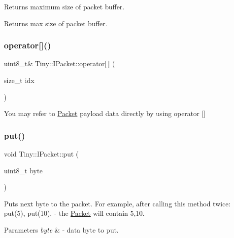 Returns maximum size of packet buffer. \begin{DoxyReturn}{Returns}
max size of packet buffer. 
\end{DoxyReturn}
\mbox{\label{classTiny_1_1IPacket_aa1d796806e21d1c72a1fc12d2f6db592}} 
\subsubsection{\texorpdfstring{operator[]()}{operator[]()}}
{\footnotesize\ttfamily uint8\+\_\+t\& Tiny\+::\+I\+Packet\+::operator\mbox{[}$\,$\mbox{]} (\begin{DoxyParamCaption}\item[{size\+\_\+t}]{idx }\end{DoxyParamCaption})\hspace{0.3cm}{\ttfamily [inline]}}

You may refer to \hyperlink{classTiny_1_1Packet}{Packet} payload data directly by using operator \mbox{[}\mbox{]} \mbox{\label{classTiny_1_1IPacket_a9d5ba62a453b9cd364c0e214c245f11d}} 
\subsubsection{\texorpdfstring{put()}{put()}\hspace{0.1cm}{\footnotesize\ttfamily [1/7]}}
{\footnotesize\ttfamily void Tiny\+::\+I\+Packet\+::put (\begin{DoxyParamCaption}\item[{uint8\+\_\+t}]{byte }\end{DoxyParamCaption})\hspace{0.3cm}{\ttfamily [inline]}}

Puts next byte to the packet. For example, after calling this method twice\+: put(5), put(10), -\/ the \hyperlink{classTiny_1_1Packet}{Packet} will contain 5,10. 
\begin{DoxyParams}{Parameters}
{\em byte} & -\/ data byte to put. \\
\hline
\end{DoxyParams}
\mbox{\label{classTiny_1_1IPacket_a9dd0344bbed4500af63a3f700d31945b}} 
